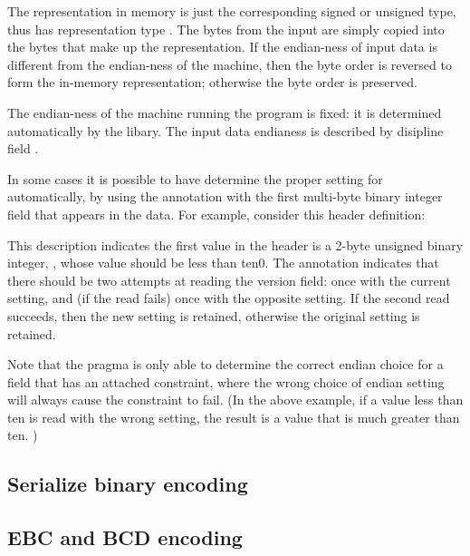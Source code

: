 The representation in memory is just the corresponding signed or
unsigned type, thus  has representation type .  The bytes from
the input are simply copied into the bytes that make up the representation.  If
the endian-ness of input data is different from the endian-ness of the
machine, then the byte order is reversed to form the in-memory
representation; otherwise the byte order is preserved.

The endian-ness of the machine running the \pads{} program is fixed: it
is determined automatically by the \pads{} libary.  
The input data endianess is described by \pads{} disipline 
field . 

In some cases it is possible to have \pads{} determine the
proper setting for  automatically, by
using the annotation 
with the first multi-byte binary integer field that appears
in the data.  For example, consider this header definition:

%
\noindent
This \padsl{} description indicates the first value in the header
is a 2-byte unsigned binary integer, ,
whose value should be less than ten0.   The  annotation indicates that there
should be two attempts at reading the version field: once with the
current  setting, and (if the read fails) once with the
opposite  setting.  If the second read succeeds, then
the new  setting is retained, otherwise the original
setting is retained.

Note that the  pragma is only able to determine the correct endian
choice for a field that has an attached constraint, where the
wrong choice of endian setting will always cause the constraint to fail.
(In the above example, if a value less than ten is read with the wrong 
setting, the result is a value that is much greater than ten. )

\subsection{Serialize binary encoding}

\sbBegin{}
\bEnd{}


\subsection{EBC and BCD encoding}

